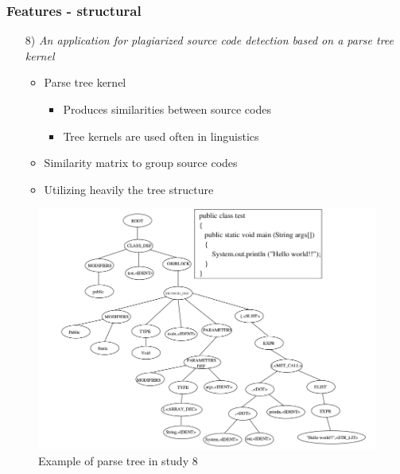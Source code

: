\documentclass[t,12pt,pdftex]{beamer}
\begin{document}
\begin{frame}
	\frametitle{Features - structural}
	\begin{itemize}
		\item[8)] \textit{An application for plagiarized source code detection based on a parse
tree kernel}
	\begin{itemize}
		\item Parse tree kernel
		\begin{itemize}
			\item Produces similarities between source codes
			\item Tree kernels are used often in linguistics
		\end{itemize}
		\item Similarity matrix to group source codes 
		\item Utilizing heavily the tree structure
	\end{itemize}
	\end{itemize}
\end{frame}

\begin{frame}
	\begin{figure}[ht]
			\centering
			\includegraphics[scale=0.3]{parse_tree}	
			\caption{Example of parse tree in study 8}
	\end{figure}
\end{frame}
\end{document}

